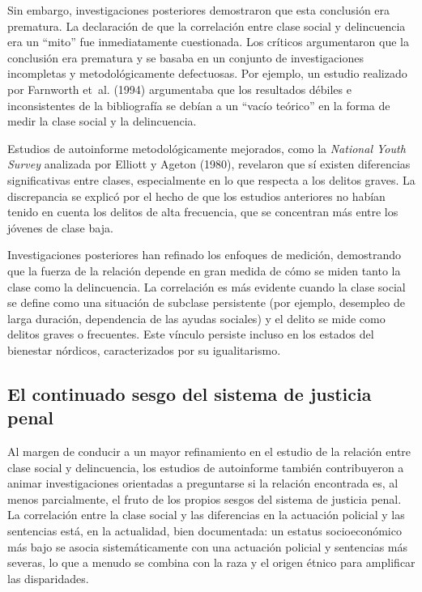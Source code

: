 \documentclass[
  spanish,
  letterpaper,
  DIV=11,
  numbers=noendperiod]{scrreprt}
\begin{document}
Sin embargo, investigaciones posteriores demostraron que esta conclusión
era prematura. La declaración de que la correlación entre clase social y
delincuencia era un ``mito'' fue inmediatamente cuestionada. Los
críticos argumentaron que la conclusión era prematura y se basaba en un
conjunto de investigaciones incompletas y metodológicamente defectuosas.
Por ejemplo, un estudio realizado por Farnworth et~al. (1994)
argumentaba que los resultados débiles e inconsistentes de la
bibliografía se debían a un ``vacío teórico'' en la forma de medir la
clase social y la delincuencia.

Estudios de autoinforme metodológicamente mejorados, como la
\emph{National Youth Survey} analizada por Elliott y Ageton (1980),
revelaron que sí existen diferencias significativas entre clases,
especialmente en lo que respecta a los delitos graves. La discrepancia
se explicó por el hecho de que los estudios anteriores no habían tenido
en cuenta los delitos de alta frecuencia, que se concentran más entre
los jóvenes de clase baja.

Investigaciones posteriores han refinado los enfoques de medición,
demostrando que la fuerza de la relación depende en gran medida de cómo
se miden tanto la clase como la delincuencia. La correlación es más
evidente cuando la clase social se define como una situación de subclase
persistente (por ejemplo, desempleo de larga duración, dependencia de
las ayudas sociales) y el delito se mide como delitos graves o
frecuentes. Este vínculo persiste incluso en los estados del bienestar
nórdicos, caracterizados por su igualitarismo.

\subsection{El continuado sesgo del sistema de justicia
penal}\label{el-continuado-sesgo-del-sistema-de-justicia-penal}

Al margen de conducir a un mayor refinamiento en el estudio de la
relación entre clase social y delincuencia, los estudios de autoinforme
también contribuyeron a animar investigaciones orientadas a preguntarse
si la relación encontrada es, al menos parcialmente, el fruto de los
propios sesgos del sistema de justicia penal. La correlación entre la
clase social y las diferencias en la actuación policial y las sentencias
está, en la actualidad, bien documentada: un estatus socioeconómico más
bajo se asocia sistemáticamente con una actuación policial y sentencias
más severas, lo que a menudo se combina con la raza y el origen étnico
para amplificar las disparidades.
\end{document}
